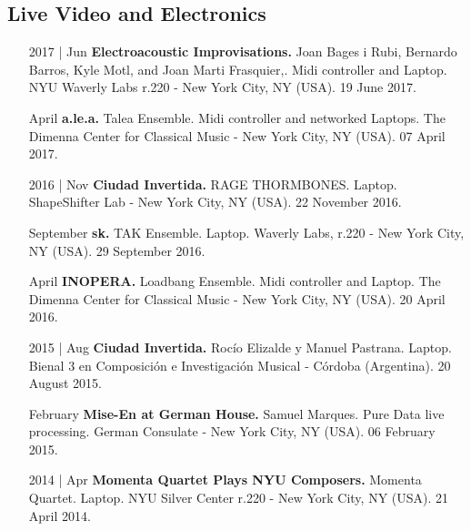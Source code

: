\documentclass[12pt]{article}%
\begin{document}
\subsection{Live Video and Electronics}%
\begin{itemize}[align=parleft,leftmargin=2.25cm,labelwidth=2cm]
\item[2017 | Jun]
\textbf{Electroacoustic Improvisations.}
Joan Bages i Rubi, Bernardo Barros, Kyle Motl, and Joan Marti Frasquier,. 
Midi controller and Laptop. 
NYU Waverly Labs r.220 {-} New York City, NY (USA). 
19 June 2017.
\end{itemize}%
\begin{itemize}[align=parleft,leftmargin=2.25cm,labelwidth=2cm]
\item[April]
\textbf{a.le.a.}
Talea Ensemble. 
Midi controller and networked Laptops. 
The Dimenna Center for Classical Music {-} New York City, NY (USA). 
07 April 2017.
\end{itemize}%
\begin{itemize}[align=parleft,leftmargin=2.25cm,labelwidth=2cm]
\item[2016 | Nov]
\textbf{Ciudad Invertida.}
RAGE THORMBONES. 
Laptop. 
ShapeShifter Lab {-} New York City, NY (USA). 
22 November 2016.
\end{itemize}%
\begin{itemize}[align=parleft,leftmargin=2.25cm,labelwidth=2cm]
\item[September]
\textbf{sk.}
TAK Ensemble. 
Laptop. 
Waverly Labs, r.220 {-} New York City, NY (USA). 
29 September 2016.
\end{itemize}%
\begin{itemize}[align=parleft,leftmargin=2.25cm,labelwidth=2cm]
\item[April]
\textbf{INOPERA.}
Loadbang Ensemble. 
Midi controller and Laptop. 
The Dimenna Center for Classical Music {-} New York City, NY (USA). 
20 April 2016.
\end{itemize}%
\begin{itemize}[align=parleft,leftmargin=2.25cm,labelwidth=2cm]
\item[2015 | Aug]
\textbf{Ciudad Invertida.}
Rocío Elizalde y Manuel Pastrana. 
Laptop. 
Bienal 3 en Composición e Investigación Musical {-} Córdoba (Argentina). 
20 August 2015.
\end{itemize}%
\begin{itemize}[align=parleft,leftmargin=2.25cm,labelwidth=2cm]
\item[February]
\textbf{Mise{-}En at German House.}
Samuel Marques. 
Pure Data live processing. 
German Consulate {-} New York City, NY (USA). 
06 February 2015.
\end{itemize}%
\begin{itemize}[align=parleft,leftmargin=2.25cm,labelwidth=2cm]
\item[2014 | Apr]
\textbf{Momenta Quartet Plays NYU Composers.}
Momenta Quartet. 
Laptop. 
NYU Silver Center r.220 {-} New York City, NY (USA). 
21 April 2014.
\end{itemize}%
\end{document}
